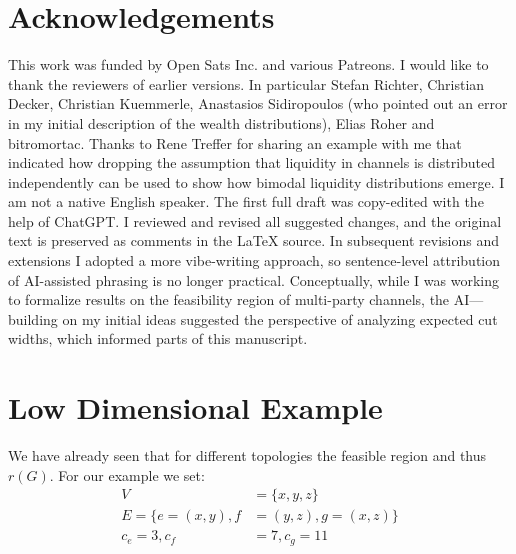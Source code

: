 \documentclass[10pt,twocolumn]{article}
\begin{document}



\section{Acknowledgements}
This work was funded by Open Sats Inc. and various Patreons. I would like to thank the reviewers of earlier versions. In particular Stefan Richter, Christian Decker, Christian Kuemmerle, Anastasios Sidiropoulos (who pointed out an error in my initial description of the wealth distributions), Elias Roher and bitromortac. Thanks to Rene Treffer for sharing an example with me that indicated how dropping the assumption that liquidity in channels is distributed independently can be used to show how bimodal liquidity distributions emerge.
I am not a native English speaker. The first full draft was copy-edited with the help of ChatGPT. I reviewed and revised all suggested changes, and the original text is preserved as comments in the LaTeX source. In subsequent revisions and extensions I adopted a more vibe-writing approach, so sentence-level attribution of AI-assisted phrasing is no longer practical. Conceptually, while I was working to formalize results on the feasibility region of multi-party channels, the AI—building on my initial ideas suggested the perspective of analyzing expected cut widths, which informed parts of this manuscript.




\appendix

  \section{Low Dimensional Example}
\label{sec:paymentsExample}
We have already seen that for different topologies the feasible region and thus $r(G)$.
For our example we set:
\begin{equation*}
  \begin{split}
    V   & =\{x,y,z\} \\
    E=\{e=(x,y),f & =(y,z), g=(x,z)\}\\
    c_e=3, c_f & =7, c_g=11
  \end{split}
\end{equation*}
\end{document}
